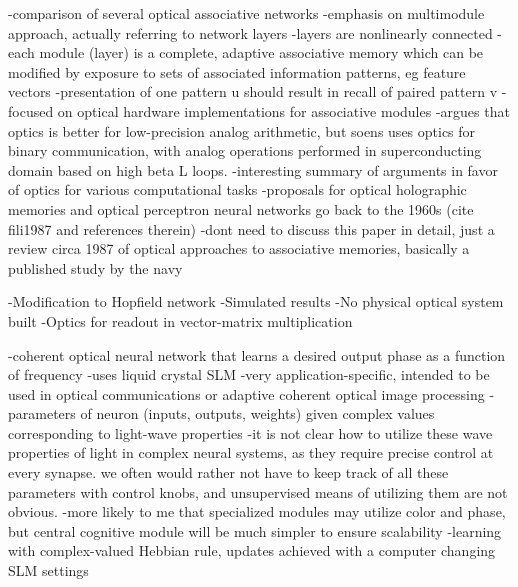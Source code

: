 \cite{fili1987}
-comparison of several optical associative networks
-emphasis on multimodule approach, actually referring to network layers
-layers are nonlinearly connected
-each module (layer) is a complete, adaptive associative memory which can be modified by exposure to sets of associated information patterns, eg feature vectors
-presentation of one pattern u should result in recall of paired pattern v
-focused on optical hardware implementations for associative modules
-argues that optics is better for low-precision analog arithmetic, but soens uses optics for binary communication, with analog operations performed in superconducting domain based on high beta L loops.
-interesting summary of arguments in favor of optics for various computational tasks
-proposals for optical holographic memories and optical perceptron neural networks go back to the 1960s (cite fili1987 and references therein)
-dont need to discuss this paper in detail, just a review circa 1987 of optical approaches to associative memories, basically a published study by the navy

\vspace{3em}
\cite{maar1987}
-Modification to Hopfield network
-Simulated results
-No physical optical system built
-Optics for readout in vector-matrix multiplication

\cite{safi1995}


\cite{kahi2003}
-coherent optical neural network that learns a desired output phase as a function of frequency
-uses liquid crystal SLM
-very application-specific, intended to be used in optical communications or adaptive coherent optical image processing
-parameters of neuron (inputs, outputs, weights) given complex values corresponding to light-wave properties
-it is not clear how to utilize these wave properties of light in complex neural systems, as they require precise control at every synapse. we often would rather not have to keep track of all these parameters with control knobs, and unsupervised means of utilizing them are not obvious.
-more likely to me that specialized modules may utilize color and phase, but central cognitive module will be much simpler to ensure scalability
-learning with complex-valued Hebbian rule, updates achieved with a computer changing SLM settings

